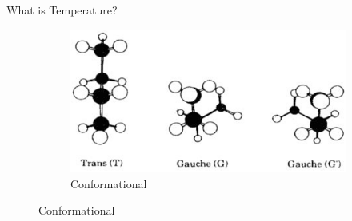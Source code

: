 \documentclass[aspectratio=169]{beamer}
\begin{document}
\begin{frame}{What is Temperature?}
\begin{figure}
            \begin{subfigure}{0.45\textwidth}
                \centering
                \includegraphics[width=0.7\linewidth]{figures/10_conformational.png}
                \caption{Conformational}
            \end{subfigure}
            \label{fig}
        \end{figure}

    \end{frame}
\end{document}
